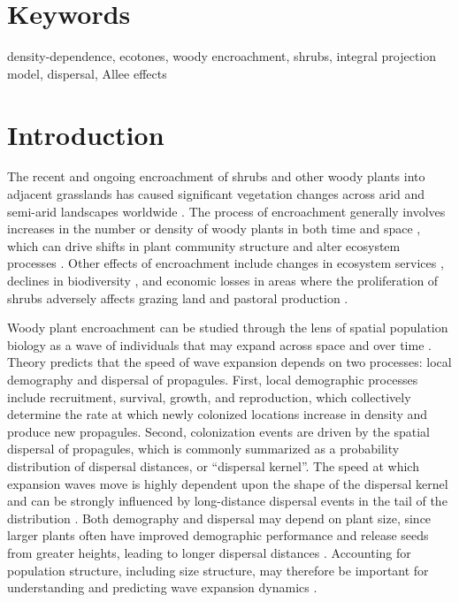 \documentclass[11pt]{article}\usepackage[]{graphicx}\usepackage[]{color}
\begin{document}
\section*{Keywords}

density-dependence, ecotones, woody encroachment, shrubs, integral projection model, dispersal, Allee effects

\newpage
\section*{Introduction}
The recent and ongoing encroachment of shrubs and other woody plants into adjacent grasslands has caused significant vegetation changes across arid and semi-arid landscapes worldwide \citep{van2000shrub, van2009causes, goslee2003high, gibbens2005vegetation,parizek2002soil, cabral2003shrub,trollope1989encroachment, roques2001dynamics}.
The process of encroachment generally involves increases in the number or density of woody plants in both time and space \citep{van2000shrub}, which can drive shifts in plant community structure and alter ecosystem processes \citep{schlesinger1990biological, ravi2009can,schlesinger1998plant, knapp2008shrub}.
Other effects of encroachment include changes in ecosystem services \citep{reed2015reorienting, kelleway2017review}, declines in biodiversity \citep{ratajczak2012woody, sirami2012changes, brandt2013regime}, and economic losses in areas where the proliferation of shrubs adversely affects grazing land and pastoral production \citep{mugasi2000economic, oba2000bush}.

Woody plant encroachment can be studied through the lens of spatial population biology as a wave of individuals that may expand across space and over time \citep{kot1996dispersal, neubert2000demography, wang2002integrodifference, pan2012invasion}.
Theory predicts that the speed of wave expansion depends on two processes: local demography and dispersal of propagules.
First, local demographic processes include recruitment, survival, growth, and reproduction, which collectively determine the rate at which newly colonized locations increase in density and produce new propagules. 
Second, colonization events are driven by the spatial dispersal of propagules, which is commonly summarized as a probability distribution of dispersal distances, or ``dispersal kernel''.
The speed at which expansion waves move is highly dependent upon the shape of the dispersal kernel and can be strongly influenced by long-distance dispersal events in the tail of the distribution \citep{skarpaas2007dispersal}.
Both demography and dispersal may depend on plant size, since larger plants often have improved demographic performance and release seeds from greater heights, leading to longer dispersal distances \citep{nathan2011mechanistic}.
Accounting for population structure, including size structure, may therefore be important for understanding and predicting wave expansion dynamics \citep{neubert2000demography}.
\end{document}
